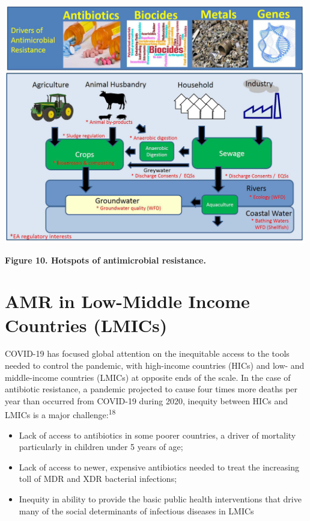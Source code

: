 \documentclass[
]{book}
\providecommand{\tightlist}{%
  \setlength{\itemsep}{0pt}\setlength{\parskip}{0pt}}
\begin{document}
\includegraphics[width=5.20833in,height=\textheight]{images/hotspots.png}

\textbf{Figure 10. Hotspots of antimicrobial resistance.}

\hypertarget{amr-in-low-middle-income-countries-lmics}{%
\section*{AMR in Low-Middle Income Countries (LMICs)}\label{amr-in-low-middle-income-countries-lmics}}

COVID-19 has focused global attention on the inequitable access to the tools needed to control the pandemic, with high-income countries (HICs) and low- and middle-income countries (LMICs) at opposite ends of the scale. In the case of antibiotic resistance, a pandemic projected to cause four times more deaths per year than occurred from COVID-19 during 2020, inequity between HICs and LMICs is a major challenge:\textsuperscript{18}

\begin{itemize}
\tightlist
\item
  Lack of access to antibiotics in some poorer countries, a driver of mortality particularly in children under 5 years of age;
\item
  Lack of access to newer, expensive antibiotics needed to treat the increasing toll of MDR and XDR bacterial infections;
\item
  Inequity in ability to provide the basic public health interventions that drive many of the social determinants of infectious diseases in LMICs
\end{itemize}
\end{document}
